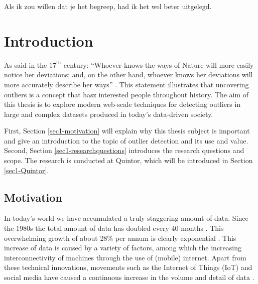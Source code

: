 \begin{savequote}[78mm] 
Als ik zou willen dat je het begreep, had ik het wel beter uitgelegd.  
\end{savequote}

\chapter{Introduction \label{chap1:introduction}}

As said in the $17^{\text{th}}$ century: ``Whoever knows the ways of Nature will more easily notice her deviations; and, on the other hand, whoever knows her deviations will more accurately describe her ways'' \cite{bacon2010novum}. This statement illustrates that uncovering outliers is a concept that hasz interested people throughout history. The aim of this thesis is to explore modern web-scale techniques for detecting outliers in large and complex datasets produced in today's data-driven society.

First, Section \ref{sec1-motivation} will explain why this thesis subject is important and give an introduction to the topic of outlier detection and its use and value. Second, Section \ref{sec1-researchquestions} introduces the research questions and scope. The research is conducted at Quintor, which will be introduced in Section \ref{sec1-Quintor}. 

\section{Motivation \label{sec1-motivation}}
In today's world we have accumulated a truly staggering amount of data. Since the 1980s the total amount of data has doubled every 40 months \cite{Hilbert01042011}. This overwhelming growth of about 28\% per annum is clearly exponential \cite{6479953}. This increase of data is caused by a variety of factors, among which the increasing interconnectivity of machines through the use of (mobile) internet. Apart from these technical innovations, movements such as the Internet of Things (IoT) and social media have caused a continuous increase in the volume and detail of data \cite{holler2014from}. 

